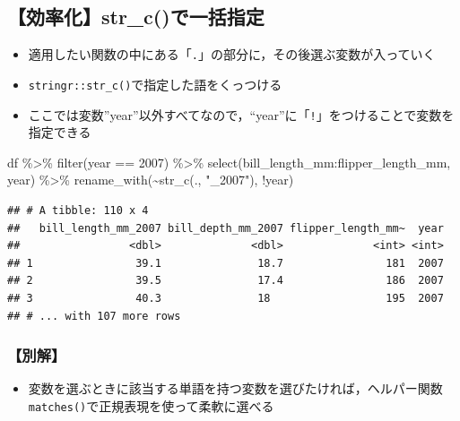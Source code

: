 \documentclass[
  xelatex,ja=standard, b5paper]{bxjsbook}
\newenvironment{Shaded}{\begin{snugshade}}{\end{snugshade}}
\newcommand{\DecValTok}[1]{\textcolor[rgb]{0.00,0.00,0.81}{#1}}
\newcommand{\FunctionTok}[1]{\textcolor[rgb]{0.00,0.00,0.00}{#1}}
\newcommand{\NormalTok}[1]{#1}
\newcommand{\SpecialCharTok}[1]{\textcolor[rgb]{0.00,0.00,0.00}{#1}}
\newcommand{\StringTok}[1]{\textcolor[rgb]{0.31,0.60,0.02}{#1}}
\providecommand{\tightlist}{%
  \setlength{\itemsep}{0pt}\setlength{\parskip}{0pt}}
\begin{document}
\hypertarget{rename-strc}{%
\subsection{【効率化】str\_c()で一括指定}\label{rename-strc}}

\begin{itemize}
\tightlist
\item
  適用したい関数の中にある「\texttt{.}」の部分に，その後選ぶ変数が入っていく
\item
  \texttt{stringr::str\_c()}で指定した語をくっつける
\item
  ここでは変数''year''以外すべてなので，``year''に「\texttt{!}」をつけることで変数を指定できる
\end{itemize}

\begin{Shaded}
\begin{Highlighting}[]
\NormalTok{df }\SpecialCharTok{\%\textgreater{}\%} 
  \FunctionTok{filter}\NormalTok{(year }\SpecialCharTok{==} \DecValTok{2007}\NormalTok{) }\SpecialCharTok{\%\textgreater{}\%} 
  \FunctionTok{select}\NormalTok{(bill\_length\_mm}\SpecialCharTok{:}\NormalTok{flipper\_length\_mm, year) }\SpecialCharTok{\%\textgreater{}\%} 
  \FunctionTok{rename\_with}\NormalTok{(}\SpecialCharTok{\textasciitilde{}}\FunctionTok{str\_c}\NormalTok{(., }\StringTok{"\_2007"}\NormalTok{),}
               \SpecialCharTok{!}\NormalTok{year)}
\end{Highlighting}
\end{Shaded}

\begin{verbatim}
## # A tibble: 110 x 4
##   bill_length_mm_2007 bill_depth_mm_2007 flipper_length_mm~  year
##                 <dbl>              <dbl>              <int> <int>
## 1                39.1               18.7                181  2007
## 2                39.5               17.4                186  2007
## 3                40.3               18                  195  2007
## # ... with 107 more rows
\end{verbatim}

\hypertarget{rename-strc-other}{%
\subsubsection{【別解】}\label{rename-strc-other}}

\begin{itemize}
\tightlist
\item
  変数を選ぶときに該当する単語を持つ変数を選びたければ，ヘルパー関数\texttt{matches()}で正規表現を使って柔軟に選べる
\end{itemize}
\end{document}
